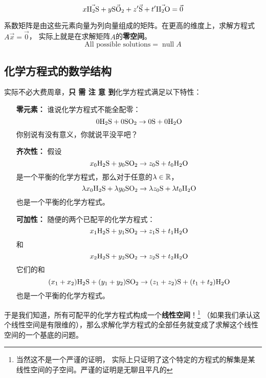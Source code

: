 \documentclass{ctexart}
\DeclareMathOperator{\nullspace}{null}
\begin{document}
\[
    x \vec{\ce{H2S}} + y \vec{\ce{SO2}} + z^\prime \vec{\ce{S}} +
    t^\prime \vec{\ce{H2O}} = \vec{0}
\]

系数矩阵是由这些元素向量为列向量组成的矩阵。在更高的维度上，求解方程式\(A\vec{x} = \vec{0}\)，
实际上就是在求解矩阵\(A\)的\textbf{零空间}。
\[
    \text{All possible solutions} = \nullspace{A}
\]

\subsection{化学方程式的数学结构}

实际不必大费周章，\textbf{只 需 注 意 到}化学方程式满足以下特性：
\begin{itemize}
    \item[\textbf{零元素：}] 谁说化学方程式不能全配零：\[
            0 \ce{H2S} + 0 \ce{SO2} \to 0 \ce{S} + 0 \ce{H2O}
        \]
        你别说有没有意义，你就说平没平吧？
    \item[\textbf{齐次性：}] 假设\[
            x_0 \ce{H2S} + y_0 \ce{SO2} \to z_0 \ce{S} + t_0 \ce{H2O}
        \]
        是一个平衡的化学方程式，那么对于任意的\(\lambda \in \mathbb{R}\)，
        \[
            \lambda x_0 \ce{H2S} + \lambda y_0 \ce{SO2} \to
            \lambda z_0 \ce{S} + \lambda t_0 \ce{H2O}
        \]
        也是一个平衡的化学方程式。
    \item[\textbf{可加性：}] 随便的两个已配平的化学方程式：\[
            x_1 \ce{H2S} + y_1 \ce{SO2} \to z_1 \ce{S} + t_1 \ce{H2O}
        \]
        和
        \[
            x_2 \ce{H2S} + y_2 \ce{SO2} \to z_2 \ce{S} + t_2 \ce{H2O}
        \]
        它们的和
        \[
            (x_1 + x_2) \ce{H2S} + (y_1 + y_2) \ce{SO2} \to
            (z_1 + z_2) \ce{S} + (t_1 + t_2) \ce{H2O}
        \]
        也是一个平衡的化学方程式。
\end{itemize}

于是我们知道，所有可配平的化学方程式构成一个\textbf{线性空间}！\footnote{当然这不是一个严谨的证明，
实际上只证明了这个特定的方程式的解集是某线性空间的子空间。严谨的证明是无聊且平凡的}
（如果我们承认这个线性空间是有限维的），那么求解化学方程式的全部任务就变成了求解这个线性空间的一个基底的问题。
\end{document}
